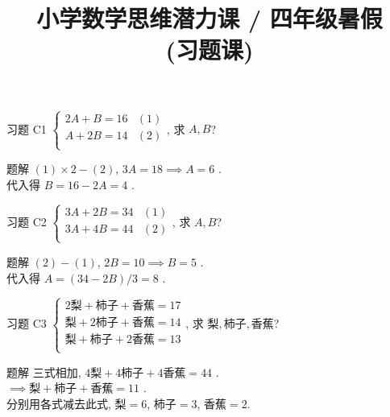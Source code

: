 \documentclass[content.tex]{subfiles}
\title{小学数学思维潜力课 / 四年级暑假 \\ (习题课)}
\begin{document}
\begin{frame}
\maketitle
\end{frame}

\begin{frame}{习题 C1}
$
\begin{cases}
2A + B = 16 & (1)\\
A + 2B = 14 & (2)\\
\end{cases}
$, \quad 求 $A, B$? 
\begin{exampleblock}{题解}
$(1)\times2 - (2)$, $3A=18\implies A=6$ . \\
代入得 $B = 16-2A = 4$ .
\end{exampleblock}
\end{frame}

\begin{frame}{习题 C2}
$
\begin{cases}
3A + 2B = 34 & (1)\\
3A + 4B = 44 & (2)\\
\end{cases}
$, \quad 求 $A, B$? 
\begin{exampleblock}{题解}
$(2) - (1)$, $2B=10\implies B=5$ . \\
代入得 $A = (34-2B)/3 = 8$ .
\end{exampleblock}
\end{frame}

\begin{frame}{习题 C3}
$
\begin{cases}
2\text{梨} + \text{柿子} + \text{香蕉} = 17\\
\text{梨} + 2\text{柿子} + \text{香蕉} = 14\\
\text{梨} + \text{柿子} + 2\text{香蕉} = 13\\
\end{cases}
$, 求 $\text{梨}, \text{柿子}, \text{香蕉}$? 
\begin{exampleblock}{题解}
三式相加, $4\text{梨} + 4\text{柿子} + 4\text{香蕉} = 44$ . \\
$\implies \text{梨} + \text{柿子} + \text{香蕉} = 11$ . \\
分别用各式减去此式, $\text{梨} = 6$, $\text{柿子} = 3$, $\text{香蕉} = 2$.
\end{exampleblock}
\end{frame}
\end{document}
